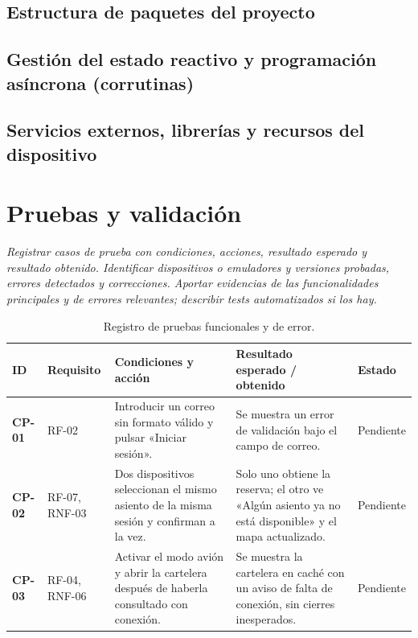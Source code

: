 \documentclass[11pt,a4paper]{article}
\begin{document}
\subsection{Estructura de paquetes del proyecto}
\subsection{Gestión del estado reactivo y programación asíncrona (corrutinas)}
\subsection{Servicios externos, librerías y recursos del dispositivo}

\section{Pruebas y validación}\label{sec:pruebas}
\textit{Registrar casos de prueba con condiciones, acciones, resultado esperado y resultado obtenido. Identificar dispositivos o emuladores y versiones probadas, errores detectados y correcciones. Aportar evidencias de las funcionalidades principales y de errores relevantes; describir tests automatizados si los hay.}

\begin{table}[htbp]
\centering
\begin{tabularx}{\textwidth}{L{1.3cm} L{2.0cm} Y Y L{1.7cm}}
\toprule
\textbf{ID} & \textbf{Requisito} & \textbf{Condiciones y acción} & \textbf{Resultado esperado / obtenido} & \textbf{Estado} \\
\midrule
\textbf{CP-01} & RF-02 & Introducir un correo sin formato válido y pulsar «Iniciar sesión». & Se muestra un error de validación bajo el campo de correo. & Pendiente \\
\midrule
\textbf{CP-02} & RF-07, RNF-03 & Dos dispositivos seleccionan el mismo asiento de la misma sesión y confirman a la vez. & Solo uno obtiene la reserva; el otro ve «Algún asiento ya no está disponible» y el mapa actualizado. & Pendiente \\
\midrule
\textbf{CP-03} & RF-04, RNF-06 & Activar el modo avión y abrir la cartelera después de haberla consultado con conexión. & Se muestra la cartelera en caché con un aviso de falta de conexión, sin cierres inesperados. & Pendiente \\
\bottomrule
\end{tabularx}
\caption{Registro de pruebas funcionales y de error.}
\label{tab:pruebas}
\end{table}
\end{document}
